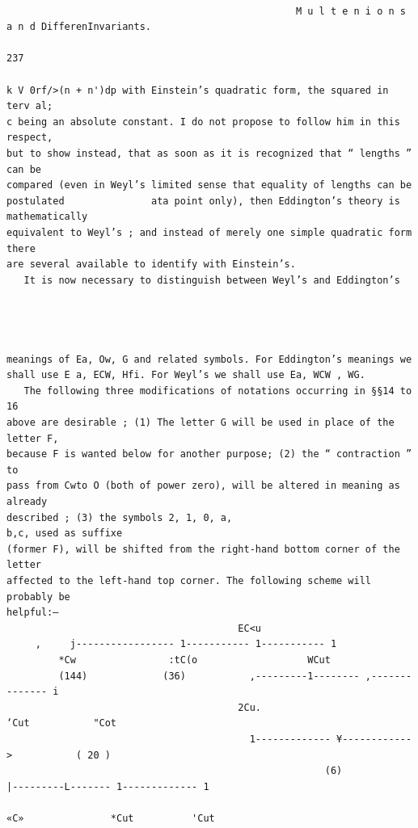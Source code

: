 \documentclass[10pt]{article}
\begin{document}
\clearpage
\begin{verbatim}

                                                  M u l t e n i o n s a n d DifferenInvariants.
                                                                                     237

k V 0rf/>(n + n')dp with Einstein’s quadratic form, the squared in terv al;
c being an absolute constant. I do not propose to follow him in this respect,
but to show instead, that as soon as it is recognized that “ lengths ” can be
compared (even in Weyl’s limited sense that equality of lengths can be
postulated               ata point only), then Eddington’s theory is mathematically
equivalent to Weyl’s ; and instead of merely one simple quadratic form there
are several available to identify with Einstein’s.
   It is now necessary to distinguish between Weyl’s and Eddington’s




meanings of Ea, Ow, G and related symbols. For Eddington’s meanings we
shall use E a, ECW, Hfi. For Weyl’s we shall use Ea, WCW , WG.
   The following three modifications of notations occurring in §§14 to 16
above are desirable ; (1) The letter G will be used in place of the letter F,
because F is wanted below for another purpose; (2) the “ contraction ” to
pass from Cwto O (both of power zero), will be altered in meaning as already
described ; (3) the symbols 2, 1, 0, a,                                    b,c, used as suffixe
(former F), will be shifted from the right-hand bottom corner of the letter
affected to the left-hand top corner. The following scheme will probably be
helpful:—
                                        EC<u
     ,     j----------------- 1----------- 1----------- 1
         *Cw                :tC(o                   WCut
         (144)             (36)           ,---------1-------- ,-------------- i
                                        2Cu.                         ‘Cut           "Cot
                                          1------------- ¥------------ >           ( 20 )
                                                       (6)                   |---------L------- 1------------- 1
                                                                            «C»               *Cut          'Cut


\end{verbatim}
\end{document}
